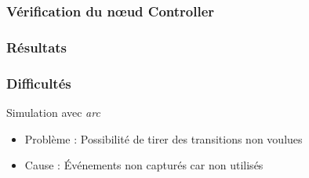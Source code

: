   \begin{frame}
   \frametitle{Vérification du n\oe{}ud Controller}
   
    
   
  \end{frame}

  \begin{frame}
   \frametitle{Résultats}
   
   
   
   
  \end{frame}

  \begin{frame}
   \frametitle{Difficultés}
   
  \begin{block}{Simulation avec \emph{arc}}
   \begin{itemize}
    \item Problème : Possibilité de tirer des transitions non voulues
    \item<2-> Cause : Événements non capturés car non utilisés
   \end{itemize}
  \end{block}
   
  \end{frame}

